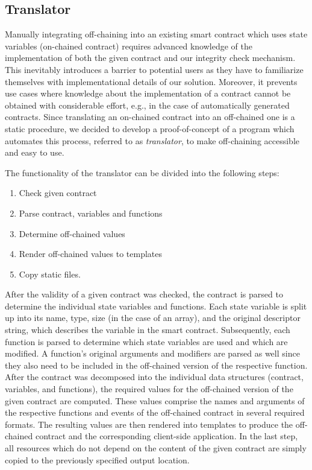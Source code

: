 \subsection{Translator}

Manually integrating off-chaining into an existing smart contract which uses state variables (on-chained contract) requires advanced knowledge of the implementation of both the given contract and our integrity check mechanism. This inevitably introduces a barrier to potential users as they have to familiarize themselves with implementational details of our solution. Moreover, it prevents use cases where knowledge about the implementation of a contract cannot be obtained with considerable effort, e.g., in the case of automatically generated contracts. Since translating an on-chained contract into an off-chained one is a static procedure, we decided to develop a proof-of-concept of a program which automates this process, referred to as \emph{translator}, to make off-chaining accessible and easy to use.

	The functionality of the translator can be divided into the following steps:
	\begin{enumerate}
	\setlength{\itemsep}{0pt}
	\setlength{\parskip}{0pt}
		\item Check given contract
		\item Parse contract, variables and functions
		\item Determine off-chained values
		\item Render off-chained values to templates
		\item Copy static files.
	\end{enumerate}
	After the validity of a given contract was checked, the contract is parsed to determine the individual state variables and functions. Each state variable is split up into its name, type, size (in the case of an array), and the original descriptor string, which describes the variable in the smart contract. Subsequently, each function is parsed to determine which state variables are used and which are modified. A function's original arguments and modifiers are parsed as well since they also need to be included in the off-chained version of the respective function. After the contract was decomposed into the individual data structures (contract, variables, and functions), the required values for the off-chained version of the given contract are computed. These values comprise the names and arguments of the respective functions and events of the off-chained contract in several required formats. The resulting values are then rendered into templates to produce the off-chained contract and the corresponding client-side application. In the last step, all resources which do not depend on the content of the given contract are simply copied to the previously specified output location.


